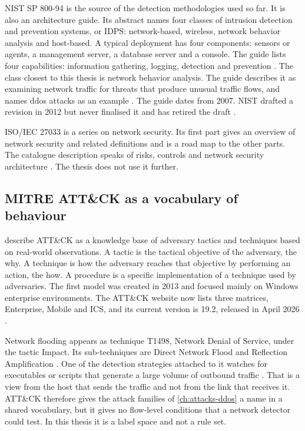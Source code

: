 NIST SP 800-94 is the source of the detection methodologies used so far. It
is also an architecture guide. Its abstract names four classes of intrusion
detection and prevention systems, or IDPS: network-based, wireless, network
behavior analysis and host-based. A typical deployment has four components:
sensors or agents, a management server, a database server and a console.
The guide lists four capabilities: information gathering, logging, detection
and prevention \citep{scarfone2007nist80094}. The class closest to this
thesis is network behavior analysis. The guide describes it as examining
network traffic for threats that produce unusual traffic flows, and names
\gls{ddos} attacks as an example \citep{scarfone2007nist80094}. The guide
dates from 2007. NIST drafted a revision in 2012 but never finalised it and
has retired the draft \citep{scarfone2007nist80094}.

ISO/IEC 27033 is a series on network security. Its first part gives an
overview of network security and related definitions and is a road map to
the other parts. The catalogue description speaks of risks, controls and
network security architecture \citep{iso2015iec27033}. The thesis does not
use it further.

\subsection{MITRE ATT\&CK as a vocabulary of behaviour}
\label{sec:mitre-attack-vocabulary}

\citet{strom2020attack} describe ATT\&CK as a knowledge base of adversary
tactics and techniques based on real-world observations. A tactic is the
tactical objective of the adversary, the why. A technique is how the
adversary reaches that objective by performing an action, the how. A
procedure is a specific implementation of a technique used by adversaries.
The first model was created in 2013 and focused mainly on Windows
enterprise environments. The ATT\&CK website now lists three matrices,
Enterprise, Mobile and ICS, and its current version is 19.2, released in
April 2026 \citep{mitre2026attackversions}.

Network flooding appears as technique T1498, Network Denial of Service,
under the tactic Impact. Its sub-techniques are Direct Network Flood and
Reflection Amplification \citep{mitre2025t1498}. One of the detection
strategies attached to it watches for executables or scripts that generate
a large volume of outbound traffic \citep{mitre2025t1498}. That is a view
from the host that sends the traffic and not from the link that receives it.
ATT\&CK therefore gives the attack families of \cref{ch:attacks-ddos} a name
in a shared vocabulary, but it gives no flow-level conditions that a network
detector could test. In this thesis it is a label space and not a rule set.

